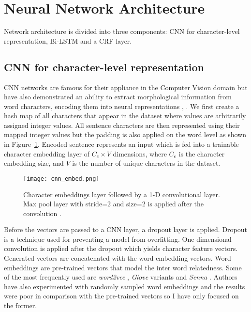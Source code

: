 \section{Neural Network Architecture}
Network architecture is divided into three components: CNN for character-level
representation, Bi-LSTM and a CRF layer.

\subsection{CNN for character-level representation}
CNN networks are famous for their appliance in the Computer Vision domain but
have also demonstrated an ability to extract morphological information
from word characters, encoding them into neural
representations \cite{santos2014learning}, \cite{chiu2015named}.
We first create a hash map of all characters
that appear in the dataset where  values are arbitrarily assigned integer
values. All sentence characters are then represented using their
mapped integer values but the padding is also applied on the word level as
shown in Figure~\ref{fig:cnn_embed}.
Encoded sentence represents an input which is fed into a trainable character embedding
layer of $C_e \times V$ dimensions, where $C_e$ is the character embedding size,
and $V$ is the number of unique characters in the dataset.

\begin{figure}
  \caption{Character embeddings layer followed by a 1-D convolutional layer.
  Max pool layer with stride=2 and size=2 is applied after the convolution
  \cite{ma2016end}.}
  \label{fig:cnn_embed}
  \centering
    \texttt{[image: cnn\_embed.png]}
\end{figure}

Before the vectors are passed to a CNN layer, a
dropout \cite{srivastava2014dropout} layer is
applied. Dropout is a technique used for preventing a model from
overfitting. One dimensional convolution is applied after the dropout which
yields character feature vectors. Generated vectors are concatenated with the word
embedding vectors. Word embeddings are pre-trained vectors
that model the inter word relatedness. Some of the most frequently used are
\textit{word2vec} \cite{mikolov2013distributed}, \textit{Glove}
variants \cite{pennington2014glove} and
\textit{Senna} \cite{collobert2011natural}. Authors have also experimented with randomly sampled word
embeddings and the results were poor in comparison with the pre-trained vectors
so I have only focused on the former.

